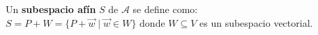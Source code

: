 \documentclass[preview]{standalone}
\begin{document}
\begin{center}
Un \textbf{subespacio afín} $S$ de $\mathcal{A}$ se define como:\\$S = P + W = \{ P + \vec{w} \mid \vec{w} \in W \}$ donde $W \subseteq V$ es un subespacio vectorial.
\end{center}
\end{document}
